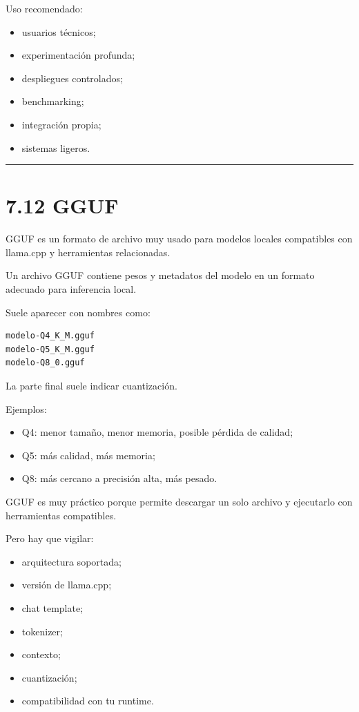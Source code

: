 Uso recomendado:

\begin{itemize}
\tightlist
\item
  usuarios técnicos;
\item
  experimentación profunda;
\item
  despliegues controlados;
\item
  benchmarking;
\item
  integración propia;
\item
  sistemas ligeros.
\end{itemize}

\begin{center}\rule{0.5\linewidth}{0.5pt}\end{center}

\section{7.12 GGUF}\label{gguf}

GGUF es un formato de archivo muy usado para modelos locales compatibles
con llama.cpp y herramientas relacionadas.

Un archivo GGUF contiene pesos y metadatos del modelo en un formato
adecuado para inferencia local.

Suele aparecer con nombres como:

\begin{lstlisting}
modelo-Q4_K_M.gguf
modelo-Q5_K_M.gguf
modelo-Q8_0.gguf
\end{lstlisting}

La parte final suele indicar cuantización.

Ejemplos:

\begin{itemize}
\tightlist
\item
  Q4: menor tamaño, menor memoria, posible pérdida de calidad;
\item
  Q5: más calidad, más memoria;
\item
  Q8: más cercano a precisión alta, más pesado.
\end{itemize}

GGUF es muy práctico porque permite descargar un solo archivo y
ejecutarlo con herramientas compatibles.

Pero hay que vigilar:

\begin{itemize}
\tightlist
\item
  arquitectura soportada;
\item
  versión de llama.cpp;
\item
  chat template;
\item
  tokenizer;
\item
  contexto;
\item
  cuantización;
\item
  compatibilidad con tu runtime.
\end{itemize}

